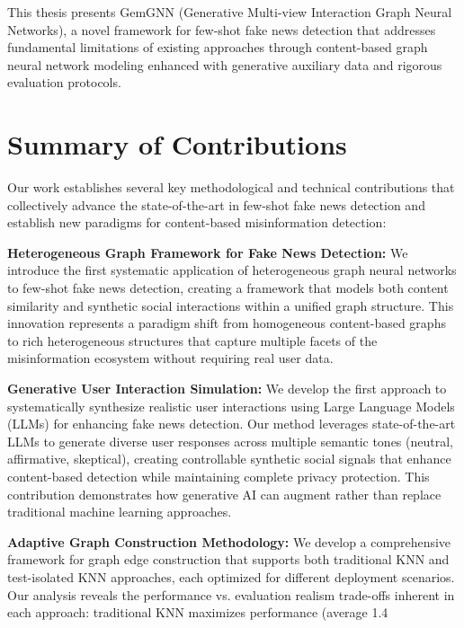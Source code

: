 
This thesis presents GemGNN (Generative Multi-view Interaction Graph Neural Networks), a novel framework for few-shot fake news detection that addresses fundamental limitations of existing approaches through content-based graph neural network modeling enhanced with generative auxiliary data and rigorous evaluation protocols.

\section{Summary of Contributions}

Our work establishes several key methodological and technical contributions that collectively advance the state-of-the-art in few-shot fake news detection and establish new paradigms for content-based misinformation detection:


\textbf{Heterogeneous Graph Framework for Fake News Detection:} We introduce the first systematic application of heterogeneous graph neural networks to few-shot fake news detection, creating a framework that models both content similarity and synthetic social interactions within a unified graph structure. This innovation represents a paradigm shift from homogeneous content-based graphs to rich heterogeneous structures that capture multiple facets of the misinformation ecosystem without requiring real user data.

\textbf{Generative User Interaction Simulation:} We develop the first approach to systematically synthesize realistic user interactions using Large Language Models (LLMs) for enhancing fake news detection. Our method leverages state-of-the-art LLMs to generate diverse user responses across multiple semantic tones (neutral, affirmative, skeptical), creating controllable synthetic social signals that enhance content-based detection while maintaining complete privacy protection. This contribution demonstrates how generative AI can augment rather than replace traditional machine learning approaches.


\textbf{Adaptive Graph Construction Methodology:} We develop a comprehensive framework for graph edge construction that supports both traditional KNN and test-isolated KNN approaches, each optimized for different deployment scenarios. Our analysis reveals the performance vs. evaluation realism trade-offs inherent in each approach: traditional KNN maximizes performance (average 1.4%

